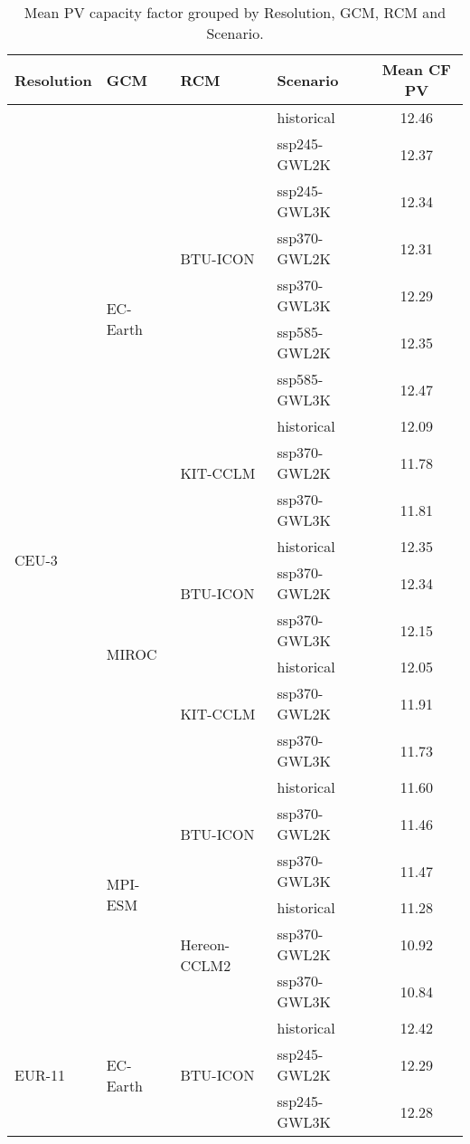 \begin{table}[!htbp]
\centering
\footnotesize
\caption{Mean PV capacity factor grouped by Resolution, GCM, RCM and Scenario.}
\label{Table:CF_Wind_changes}
\begin{tabular}{lll|l|c}
\toprule
Resolution & GCM & RCM & Scenario & Mean CF PV \\
\midrule
\multirow{22}{*}{CEU-3} & \multirow{10}{*}{EC-Earth} & \multirow{7}{*}{BTU-ICON} & historical & 12.46 \\
 &  &  & ssp245-GWL2K & 12.37 \\
 &  &  & ssp245-GWL3K & 12.34 \\
 &  &  & ssp370-GWL2K & 12.31 \\
 &  &  & ssp370-GWL3K & 12.29 \\
 &  &  & ssp585-GWL2K & 12.35 \\
 &  &  & ssp585-GWL3K & 12.47 \\
\cmidrule(lr){3-4}
 &  & \multirow{3}{*}{KIT-CCLM} & historical & 12.09 \\
 &  &  & ssp370-GWL2K & 11.78 \\
 &  &  & ssp370-GWL3K & 11.81 \\
\cmidrule(lr){3-4}
\cmidrule(lr){2-4}
 & \multirow{6}{*}{MIROC} & \multirow{3}{*}{BTU-ICON} & historical & 12.35 \\
 &  &  & ssp370-GWL2K & 12.34 \\
 &  &  & ssp370-GWL3K & 12.15 \\
\cmidrule(lr){3-4}
 &  & \multirow{3}{*}{KIT-CCLM} & historical & 12.05 \\
 &  &  & ssp370-GWL2K & 11.91 \\
 &  &  & ssp370-GWL3K & 11.73 \\
\cmidrule(lr){3-4}
\cmidrule(lr){2-4}
 & \multirow{6}{*}{MPI-ESM} & \multirow{3}{*}{BTU-ICON} & historical & 11.60 \\
 &  &  & ssp370-GWL2K & 11.46 \\
 &  &  & ssp370-GWL3K & 11.47 \\
\cmidrule(lr){3-4}
 &  & \multirow{3}{*}{Hereon-CCLM2} & historical & 11.28 \\
 &  &  & ssp370-GWL2K & 10.92 \\
 &  &  & ssp370-GWL3K & 10.84 \\
\midrule
\multirow{22}{*}{EUR-11} & \multirow{10}{*}{EC-Earth} & \multirow{7}{*}{BTU-ICON} & historical & 12.42 \\
 &  &  & ssp245-GWL2K & 12.29 \\
 &  &  & ssp245-GWL3K & 12.28 \\

\end{tabular}
\end{table}
